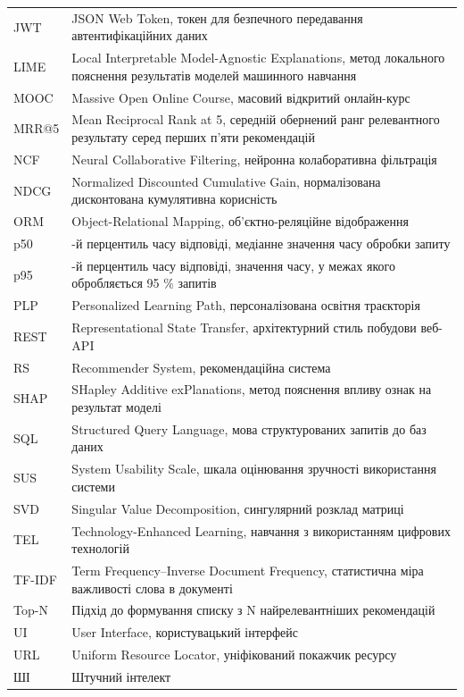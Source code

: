 \documentclass[
]{article}
\begin{document}
{\begin{longtable}[]{@{}
  >{\raggedright\arraybackslash}p{}
  >{\raggedright\arraybackslash}p{}@{}}
JWT & JSON Web Token, токен для безпечного передавання автентифікаційних
даних \\
LIME & Local Interpretable Model-Agnostic Explanations, метод локального
пояснення результатів моделей машинного навчання \\
MOOC & Massive Open Online Course, масовий відкритий онлайн-курс \\
MRR@5 & Mean Reciprocal Rank at 5, середній обернений ранг релевантного
результату серед перших п'яти рекомендацій \\
NCF & Neural Collaborative Filtering, нейронна колаборативна
фільтрація \\
NDCG & Normalized Discounted Cumulative Gain, нормалізована дисконтована
кумулятивна корисність \\
ORM & Object-Relational Mapping, об'єктно-реляційне відображення \\
p50 & 50-й перцентиль часу відповіді, медіанне значення часу обробки
запиту \\
p95 & 95-й перцентиль часу відповіді, значення часу, у межах якого
обробляється 95 \% запитів \\
PLP & Personalized Learning Path, персоналізована освітня траєкторія \\
REST & Representational State Transfer, архітектурний стиль побудови
веб-API \\
RS & Recommender System, рекомендаційна система \\
SHAP & SHapley Additive exPlanations, метод пояснення впливу ознак на
результат моделі \\
SQL & Structured Query Language, мова структурованих запитів до баз
даних \\
SUS & System Usability Scale, шкала оцінювання зручності використання
системи \\
SVD & Singular Value Decomposition, сингулярний розклад матриці \\
TEL & Technology-Enhanced Learning, навчання з використанням цифрових
технологій \\
TF-IDF & Term Frequency--Inverse Document Frequency, статистична міра
важливості слова в документі \\
Top-N & Підхід до формування списку з N найрелевантніших рекомендацій \\
UI & User Interface, користувацький інтерфейс \\
URL & Uniform Resource Locator, уніфікований покажчик ресурсу \\
ШІ & Штучний інтелект \\
\end{longtable}
}
\end{document}
